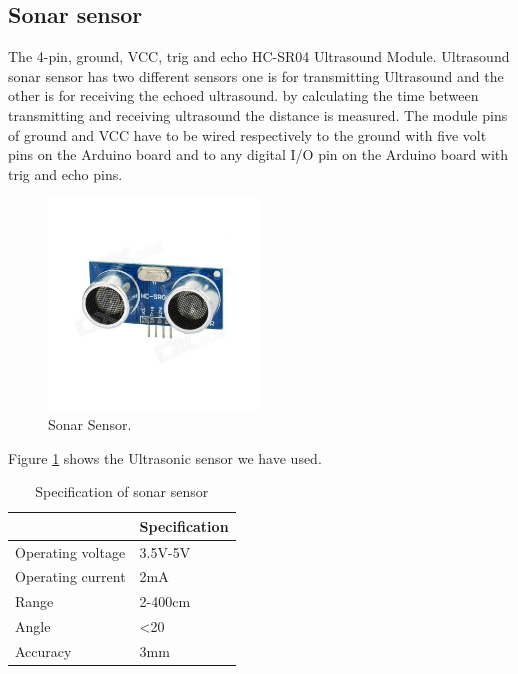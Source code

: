 \subsection{Sonar sensor}
The 4-pin, ground, VCC, trig and echo HC-SR04 Ultrasound Module. Ultrasound sonar sensor has two different sensors one is for transmitting Ultrasound and the other is for receiving the echoed ultrasound. by calculating the time between transmitting and receiving ultrasound the distance is measured. The module pins of ground and VCC have to be wired respectively to the ground with five volt pins on the Arduino board and to any digital I/O pin on the Arduino board with trig and echo pins.
\begin{figure}[h]
\centering
\includegraphics[width=0.5\textwidth]{figures/sonar_sensor.jpg}
\caption{Sonar Sensor.}
\label{Sonar1}
\end{figure}
Figure \ref{Sonar1} shows the Ultrasonic sensor we have used.

\begin{table}[H]
\centering
\caption{Specification of sonar sensor}
\begin{tabular}{|l|l|}
\hline
\multicolumn{1}{|c|}{\cellcolor[HTML]{FFFFFF}{\color[HTML]{333333} \textbf{Characteristics}}} & \textbf{Specification} \\ \hline
Operating voltage                                                                       & 3.5V-5V                \\ \hline
Operating current                                                                       & 2mA                    \\ \hline
Range                                                                                   & 2-400cm                \\ \hline
Angle                                                                                   & \textless{}20          \\ \hline
Accuracy                                                                                & 3mm                    \\ \hline
\end{tabular}
\end{table}

